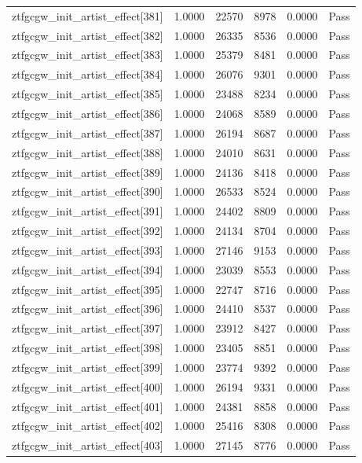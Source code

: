 \begin{table}[htbp]
\begin{tabular}{llrrll}
ztfgcgw\_init\_artist\_effect[381] & 1.0000 & 22570 & 8978 & 0.0000 & Pass \\
ztfgcgw\_init\_artist\_effect[382] & 1.0000 & 26335 & 8536 & 0.0000 & Pass \\
ztfgcgw\_init\_artist\_effect[383] & 1.0000 & 25379 & 8481 & 0.0000 & Pass \\
ztfgcgw\_init\_artist\_effect[384] & 1.0000 & 26076 & 9301 & 0.0000 & Pass \\
ztfgcgw\_init\_artist\_effect[385] & 1.0000 & 23488 & 8234 & 0.0000 & Pass \\
ztfgcgw\_init\_artist\_effect[386] & 1.0000 & 24068 & 8589 & 0.0000 & Pass \\
ztfgcgw\_init\_artist\_effect[387] & 1.0000 & 26194 & 8687 & 0.0000 & Pass \\
ztfgcgw\_init\_artist\_effect[388] & 1.0000 & 24010 & 8631 & 0.0000 & Pass \\
ztfgcgw\_init\_artist\_effect[389] & 1.0000 & 24136 & 8418 & 0.0000 & Pass \\
ztfgcgw\_init\_artist\_effect[390] & 1.0000 & 26533 & 8524 & 0.0000 & Pass \\
ztfgcgw\_init\_artist\_effect[391] & 1.0000 & 24402 & 8809 & 0.0000 & Pass \\
ztfgcgw\_init\_artist\_effect[392] & 1.0000 & 24134 & 8704 & 0.0000 & Pass \\
ztfgcgw\_init\_artist\_effect[393] & 1.0000 & 27146 & 9153 & 0.0000 & Pass \\
ztfgcgw\_init\_artist\_effect[394] & 1.0000 & 23039 & 8553 & 0.0000 & Pass \\
ztfgcgw\_init\_artist\_effect[395] & 1.0000 & 22747 & 8716 & 0.0000 & Pass \\
ztfgcgw\_init\_artist\_effect[396] & 1.0000 & 24410 & 8537 & 0.0000 & Pass \\
ztfgcgw\_init\_artist\_effect[397] & 1.0000 & 23912 & 8427 & 0.0000 & Pass \\
ztfgcgw\_init\_artist\_effect[398] & 1.0000 & 23405 & 8851 & 0.0000 & Pass \\
ztfgcgw\_init\_artist\_effect[399] & 1.0000 & 23774 & 9392 & 0.0000 & Pass \\
ztfgcgw\_init\_artist\_effect[400] & 1.0000 & 26194 & 9331 & 0.0000 & Pass \\
ztfgcgw\_init\_artist\_effect[401] & 1.0000 & 24381 & 8858 & 0.0000 & Pass \\
ztfgcgw\_init\_artist\_effect[402] & 1.0000 & 25416 & 8308 & 0.0000 & Pass \\
ztfgcgw\_init\_artist\_effect[403] & 1.0000 & 27145 & 8776 & 0.0000 & Pass \\

\end{tabular}
\end{table}
